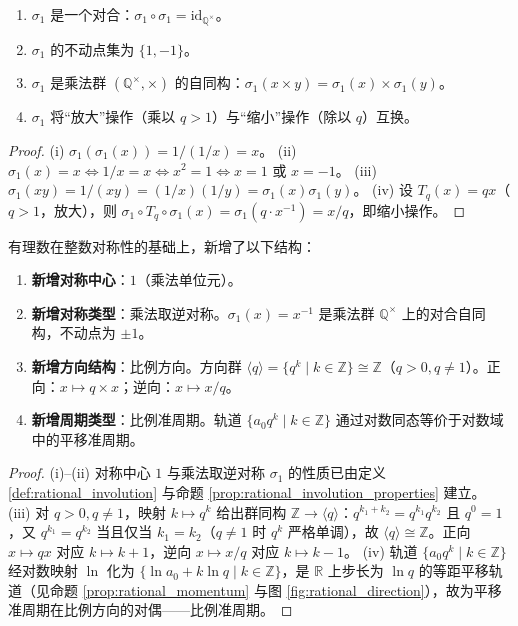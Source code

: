 \begin{proposition}\label{prop:rational_involution_properties}
\begin{enumerate}[label=(\roman*)]
    \item $\sigma_1$ 是一个对合：$\sigma_1 \circ \sigma_1 = \text{id}_{\mathbb{Q}^{\times}}$。
    \item $\sigma_1$ 的不动点集为 $\{1, -1\}$。
    \item $\sigma_1$ 是乘法群 $(\mathbb{Q}^{\times}, \times)$ 的自同构：$\sigma_1(x \times y) = \sigma_1(x) \times \sigma_1(y)$。
    \item $\sigma_1$ 将“放大”操作（乘以 $q>1$）与“缩小”操作（除以 $q$）互换。
\end{enumerate}
\end{proposition}

\begin{proof}
(i) $\sigma_1(\sigma_1(x)) = 1/(1/x) = x$。
(ii) $\sigma_1(x) = x \iff 1/x = x \iff x^2 = 1 \iff x = 1$ 或 $x = -1$。
(iii) $\sigma_1(xy) = 1/(xy) = (1/x)(1/y) = \sigma_1(x) \sigma_1(y)$。
(iv) 设 $T_q(x) = qx$（$q>1$，放大），则 $\sigma_1 \circ T_q \circ \sigma_1(x) = \sigma_1(q \cdot x^{-1}) = x/q$，即缩小操作。
\end{proof}

\begin{proposition}[有理数的方向结构与周期类型]\label{prop:rational_direction_period}
有理数在整数对称性的基础上，新增了以下结构：
\begin{enumerate}[label=(\roman*)]
    \item \textbf{新增对称中心}：$1$（乘法单位元）。
    \item \textbf{新增对称类型}：乘法取逆对称。$\sigma_1(x) = x^{-1}$ 是乘法群 $\mathbb{Q}^{\times}$ 上的对合自同构，不动点为 $\pm 1$。
    \item \textbf{新增方向结构}：比例方向。方向群 $\langle q \rangle = \{q^k \mid k \in \mathbb{Z}\} \cong \mathbb{Z}$（$q > 0, q \neq 1$）。正向：$x \mapsto q \times x$；逆向：$x \mapsto x / q$。
    \item \textbf{新增周期类型}：比例准周期。轨道 $\{a_0 q^k \mid k \in \mathbb{Z}\}$ 通过对数同态等价于对数域中的平移准周期。
\end{enumerate}
\end{proposition}

\begin{proof}
(i)–(ii) 对称中心 $1$ 与乘法取逆对称 $\sigma_1$ 的性质已由定义 \ref{def:rational_involution} 与命题 \ref{prop:rational_involution_properties} 建立。
(iii) 对 $q > 0, q \neq 1$，映射 $k \mapsto q^k$ 给出群同构 $\mathbb{Z} \to \langle q \rangle$：$q^{k_1 + k_2} = q^{k_1} q^{k_2}$ 且 $q^0 = 1$，又 $q^{k_1} = q^{k_2}$ 当且仅当 $k_1 = k_2$（$q \neq 1$ 时 $q^k$ 严格单调），故 $\langle q \rangle \cong \mathbb{Z}$。正向 $x \mapsto qx$ 对应 $k \mapsto k+1$，逆向 $x \mapsto x/q$ 对应 $k \mapsto k-1$。
(iv) 轨道 $\{a_0 q^k \mid k \in \mathbb{Z}\}$ 经对数映射 $\ln$ 化为 $\{\ln a_0 + k \ln q \mid k \in \mathbb{Z}\}$，是 $\mathbb{R}$ 上步长为 $\ln q$ 的等距平移轨道（见命题 \ref{prop:rational_momentum} 与图 \ref{fig:rational_direction}），故为平移准周期在比例方向的对偶——比例准周期。
\end{proof}

